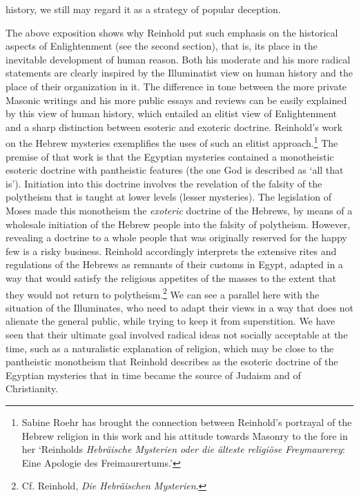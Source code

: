 history, we still may regard it as a strategy of popular deception. 

 The above exposition shows why Reinhold put such emphasis on the historical aspects of Enlightenment (see the second section), that is, its place in the inevitable development of human reason. Both his moderate and his more radical statements are clearly inspired by the Illuminatist view on human history and the place of their organization in it. The difference in tone between the more private Masonic writings and his more public essays and reviews can be easily explained by this view of human history, which entailed an elitist view of Enlightenment and a sharp distinction between esoteric and exoteric doctrine. Reinhold's work on the Hebrew mysteries exemplifies the uses of such an elitist approach.\footnote{ Sabine Roehr has brought the connection between Reinhold's portrayal of the Hebrew religion in this work and his attitude towards Masonry to the fore in her `Reinholds \textit{Hebr\"{a}ische Mysterien oder die \"{a}lteste religi\"{o}se Freymaurerey}: Eine Apologie des Freimaurertums.'} The premise of that work is that the Egyptian mysteries contained a monotheistic esoteric doctrine with pantheistic features (the one God is described as `all that is'). Initiation into this doctrine involves the revelation of the falsity of the polytheism that is taught at lower levels (lesser mysteries). The legislation of Moses made this monotheism the \textit{exoteric} doctrine of the Hebrews, by means of a wholesale initiation of the Hebrew people into the falsity of polytheism. However, revealing a doctrine to a whole people that was originally reserved for the happy few is a risky business. Reinhold accordingly interprets the extensive rites and regulations of the Hebrews as remnants of their customs in Egypt, adapted in a way that would satisfy the religious appetites of the masses to the extent that they would not return to polytheism.\footnote{ Cf. Reinhold, \textit{\-Die Hebr\"{a}ischen Mysterien}. } We can see a parallel here with the situation of the Illuminates, who need to adapt their views in a way that does not alienate the general public, while trying to keep it from superstition. We have seen that their ultimate goal involved radical ideas not socially acceptable at the time, such as a naturalistic explanation of religion, which may be close to the pantheistic monotheism that Reinhold describes as the esoteric doctrine of the Egyptian mysteries that in time became the source of Judaism and of Christianity. 

